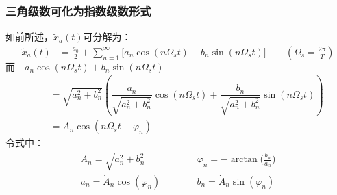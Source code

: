 \documentclass[notheorems,compress,mathserif,table]{beamer}
\begin{document}
\begin{frame}[shrink]\frametitle{三角级数可化为指数级数形式}%
如前所述，$ \tilde{x}_a(t)  $可分解为：
\begin{equation*}
\begin{split}
	\tilde{x}_a(t) &= \frac{a_0}{2}+\sum_{n=1}^{\infty}\Big[a_n \cos(n \Omega_s t)+ b_n \sin(n \Omega_s t)\Big]\quad\quad    %
                                         \left(\Omega_s = \frac{2\pi}{T}\right)
\end{split}
\end{equation*}
$$\mbox{而} \quad a_n \cos(n \Omega_s t)+ b_n \sin(n\Omega_s t)\qquad\qquad\qquad\qquad\qquad\qquad\qquad\qquad\qquad\qquad$$
\begin{equation*}
\begin{split}
\quad             &= \sqrt{a^2_n +b^2_n}\left (\dfrac{a_n}{\sqrt{a^2_n +b^2_n}}\cos(n \Omega_s t)+ \dfrac{b_n}{\sqrt{a^2_n +b^2_n}} \sin(n\Omega_s t)\right )\\
\quad             &=  \dot{A}_n \cos(n \Omega_s t +\varphi_n)
\end{split}
\end{equation*}
令式中：
\begin{equation*}
\begin{split}
       \dot{A}_n = \sqrt{a^2_n +b^2_n}\qquad      &\quad    \varphi_n = - \arctan\Big(\frac{b_n}{a_n}\Big)\\
       a_n= \dot{A}_n \cos(\varphi_n)\qquad        &\quad    b_n = \dot{A}_n \sin(\varphi_n) \\
 \end{split}
\end{equation*}
\end{frame}
%
%
%
\end{document}
